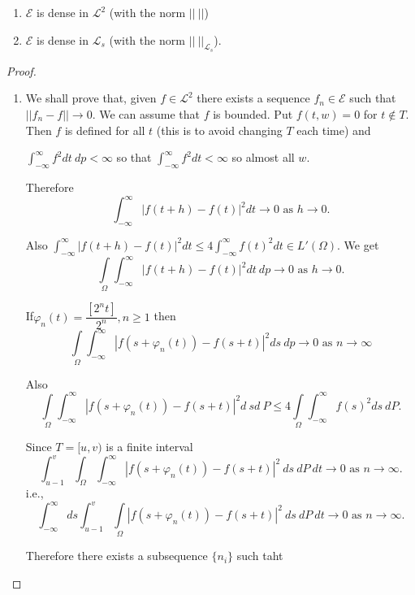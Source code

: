 \setcounter{thm}{0}
\begin{thm}\label{chap5-sec2-thm1}%
\begin{enumerate}[1]
\item $\mathscr{E}$ is dense in $\mathscr{L}^2$ (with the norm $|| ~ ||$)

\item $\mathscr{E}$ is dense in $\mathscr{L}_s$ (with the norm $|| ~
    ||_{\mathscr{L}_s}$).  
\end{enumerate}
\end{thm}

\begin{proof}%
\begin{enumerate}
\item 
 We shall prove that, given $f \in \mathscr{L}^2$ there exists a
  sequence $f_n \in \mathscr{E}$ such that $|| f_n - f|| \to 0$. We
  can assume that $f$ is bounded. Put $f(t, w) = 0$ for $t \notin
  T$. Then $f$ is defined for all $t$ (this is to avoid changing $T$
  each time) and  
  
  $\int^{\infty}_{- \infty} f^2 dt\ dp < \infty$ so that
  $\int^{\infty}_{- \infty} f^2 dt < \infty$ so almost all $w$. 

Therefore 
$$
\int^{\infty}_{- \infty}|f(t+h) - f(t) |^2 dt \to 0 \text{ as } h \to 0.
$$

Also $\int^{\infty}_{- \infty} |f(t+h) - f(t) |^2 dt \leq 4
\int^{\infty}_{- \infty} f(t)^2 dt \in L' (\Omega)$. We get 
$$
\int \limits_{\Omega} \int^{\infty}_{- \infty} |f(t+h) -f (t) |^2
dt\ dp 
\to 0 \text{ as } h \to 0. 
$$

If\pageoriginale $\varphi_n (t) = \dfrac{[2^n t]}{2^n}, n \geq 1$ then 
$$
\int\limits_{\Omega} \int^{\infty}_{- \infty} | f (s+ \varphi_n (t))
- f(s+t)|^2 ds\ dp \to 0 \text{\ as\ } n \to \infty 
$$

Also 
$$
\int\limits_{\Omega} \int^{\infty}_{- \infty}|f(s + \varphi_n
(t)) - f(s+t)|^2 d\  sd\ P \leq 4 \int\limits_{\Omega}
\int^{\infty}_{- \infty} f(s)^2  ds\  dP.
$$ 

Since $T= [u, v) $ is a finite interval
$$
\int^v_{u-1} \int_{\Omega} \int^{\infty}_{- \infty} | f (s + \varphi_n
  (t)) - f(s+t) |^2\ ds\  dP\  dt \to 0 \text{ as } n \to
  \infty.
$$
i.e.,
$$
\int^{\infty}_{- \infty} ds \int^v_{u-1}
  \int\limits_{\Omega} |f(s+ \varphi_n (t)) - f(s+t)
  |^2\  ds\  dP\  dt \to 0 \text{ as } n \to \infty.
$$ 

Therefore there exists a subsequence $\{n_i \}$ such taht 


\end{enumerate}
\end{proof}
